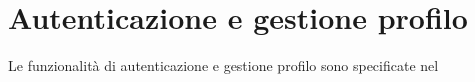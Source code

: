 \section{Autenticazione e gestione profilo}
	Le funzionalità di autenticazione e gestione profilo sono specificate nel \ManualeUtente{}